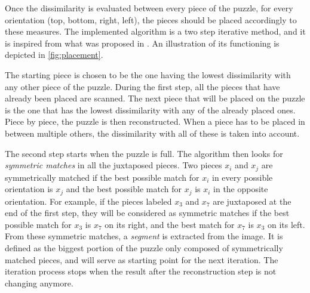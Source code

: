 Once the dissimilarity is evaluated between every piece of the puzzle, for every orientation (top, bottom, right, left), the pieces should be placed accordingly to these measures. The implemented algorithm is a two step iterative method, and it is inspired from what was proposed in \cite{greedy}. An illustration of its functioning is depicted in \autoref{fig:placement}.

The starting piece is chosen to be the one having the lowest dissimilarity with any other piece of the puzzle. During the first step, all the pieces that have already been placed are scanned. The next piece that will be placed on the puzzle  is the one that has the lowest dissimilarity with any of the already placed ones. Piece by piece, the puzzle is then reconstructed. When a piece has to be placed in between multiple others, the dissimilarity with all of these is taken into account.


The second step starts when the puzzle is full. The algorithm then looks for \textit{symmetric matches} in all the juxtaposed pieces. Two pieces $x_i$ and $x_j$ are symmetrically matched if the best possible match for $x_i$ in every possible orientation is $x_j$ and the best possible match for $x_j$ is $x_i$ in the opposite orientation. For example, if the pieces labeled $x_3$ and $x_7$ are juxtaposed at the end of the first step, they will be considered as symmetric matches if the best possible match for $x_3$ is $x_7$ on its right, and the best match for $x_7$ is $x_3$ on its left. From these symmetric matches, a \textit{segment} is extracted from the image. It is defined as the biggest portion of the puzzle only composed of symmetrically matched pieces, and will serve as starting point for the next iteration. The iteration process stops when the result after the reconstruction step is not changing anymore.


